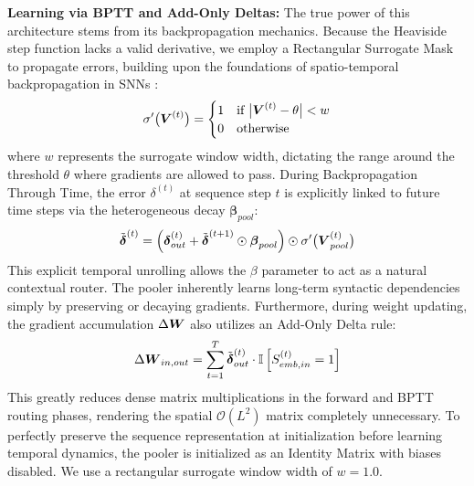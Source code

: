 \documentclass[preprint,12pt]{elsarticle}
\begin{document}
\textbf{Learning via BPTT and Add-Only Deltas:} The true power of this architecture stems from its backpropagation mechanics. Because the Heaviside step function lacks a valid derivative, we employ a Rectangular Surrogate Mask to propagate errors, building upon the foundations of spatio-temporal backpropagation in SNNs \citep{neftci2019surrogate}:
\begin{equation}
\sigma'\big(\boldsymbol{V}^{(t)}\big) = \begin{cases} 1 & \text{if } \big|\boldsymbol{V}^{(t)} - \theta\big| < w \\ 0 & \text{otherwise} \end{cases}
\end{equation}
where $w$ represents the surrogate window width, dictating the range around the threshold $\theta$ where gradients are allowed to pass. During Backpropagation Through Time, the error $\delta^{(t)}$ at sequence step $t$ is explicitly linked to future time steps via the heterogeneous decay $\bm{\beta}_{pool}$:
\begin{equation}
\tilde{\boldsymbol{\delta}}^{(t)} = \left( \boldsymbol{\delta}_{out}^{(t)} + \tilde{\boldsymbol{\delta}}^{(t+1)} \odot \boldsymbol{\beta}_{pool} \right) \odot \sigma'\big(\boldsymbol{V}_{pool}^{(t)}\big)
\end{equation}
This explicit temporal unrolling allows the $\beta$ parameter to act as a natural contextual router. The pooler inherently learns long-term syntactic dependencies simply by preserving or decaying gradients. Furthermore, during weight updating, the gradient accumulation $\Delta \boldsymbol{W}$ also utilizes an Add-Only Delta rule:
\begin{equation}
\Delta \boldsymbol{W}_{in, out} = \sum_{t=1}^{T} \tilde{\boldsymbol{\delta}}^{(t)}_{out} \cdot \mathbb{I}\left[ S_{emb, in}^{(t)} = 1 \right]
\end{equation}
This greatly reduces dense matrix multiplications in the forward and BPTT routing phases, rendering the spatial $\mathcal{O}(L^2)$ matrix completely unnecessary. To perfectly preserve the sequence representation at initialization before learning temporal dynamics, the pooler is initialized as an Identity Matrix with biases disabled. We use a rectangular surrogate window width of $w=1.0$.
\end{document}
